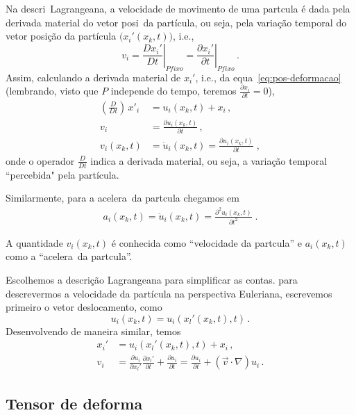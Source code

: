 Na descri\cao\ Lagrangeana, a velocidade de movimento de
uma part\ih cula \'e dada pela derivada material do vetor posi\cao\ da part\'icula,
ou seja, pela varia\c{c}\~ao temporal do vetor posi\c{c}\~ao da
part\'icula $\bigl(x_i'(x_k,t)\bigr)$, i.e.,
\begin{equation}
  v_i=\left. \frac{Dx_i'}{Dt}\right|_{P fixo} =\left. \frac{\partial x_i'}{\partial t}\right|_{P fixo} \, .
\end{equation}
Assim, calculando a derivada material de $x_i'$, i.e., da equa\cao\ \ref{eq:pos-deformacao}
(lembrando, visto que $P$ independe do tempo, teremos $\frac{\partial x_i}{\partial t}=0$),
\begin{align}
  \left(\frac{D}{Dt}\right)\,x'_i &= u_i(x_k,t) + x_i \, , \\
  v_i &= \frac{\partial u_i(x_k,t)}{\partial t}\, , \\
  v_i(x_k,t) &= \dot{u}_i(x_k,t) = \frac{\partial u_i(x_k,t)}
{\partial t} \; ,
\end{align}
onde o operador $\frac{D}{Dt}$ indica a derivada material, ou seja, a
varia\c{c}\~ao temporal ``percebida" \hspace{1pt} pela part\'icula.

Similarmente, para a acelera\cao\ da part\ih cula chegamos em
\begin{eqnarray}
a_i(x_k,t) = \ddot{u}_i(x_k,t) = \frac{\partial^2 u_i(x_k,t)}
{\partial t^2} \; .
\end{eqnarray}

A quantidade $v_i(x_k,t)$ \'e conhecida como ``velocidade
da part\ih cula'' e $a_i(x_k,t)$ como a ``acelera\cao\ da
part\ih cula''.

Escolhemos a descri\c{c}\~ao Lagrangeana para simplificar as contas.
para descrevermos a velocidade da part\'icula na perspectiva Euleriana,
escrevemos primeiro o vetor deslocamento, como
\begin{equation}
   u_i(x_k,t)=u_i(x_l'(x_k,t),t) \, .
\end{equation}
Desenvolvendo de maneira similar, temos
\begin{align}
  x_i'&=u_i(x_l'(x_k,t),t) +  x_i \, , \\
  v_i &= \frac{\partial u_i}{\partial x_l'}\frac{\partial x_l'}{\partial t}
  +\frac{\partial u_i}{\partial t} = \frac{\partial u_i}{\partial t} +
  (\vec{v}\cdot\nabla)u_i \, .
\end{align}
\subsection{Tensor de deforma\cao}

